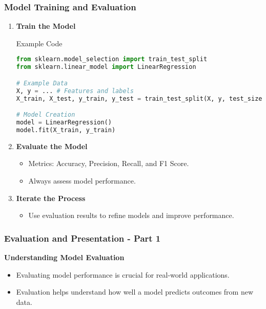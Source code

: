 \documentclass[aspectratio=169]{beamer}
\begin{document}
\begin{frame}[fragile]
    \frametitle{Model Training and Evaluation}
    \begin{enumerate}[resume]
        \item \textbf{Train the Model}
        \begin{block}{Example Code}
            \begin{lstlisting}[language=Python]
from sklearn.model_selection import train_test_split
from sklearn.linear_model import LinearRegression

# Example Data
X, y = ... # Features and labels
X_train, X_test, y_train, y_test = train_test_split(X, y, test_size=0.2, random_state=42)

# Model Creation
model = LinearRegression()
model.fit(X_train, y_train)
            \end{lstlisting}
        \end{block}
        
        \item \textbf{Evaluate the Model}
        \begin{itemize}
            \item Metrics: Accuracy, Precision, Recall, and F1 Score.
            \item Always assess model performance.
        \end{itemize}

        \item \textbf{Iterate the Process}
        \begin{itemize}
            \item Use evaluation results to refine models and improve performance.
        \end{itemize}
    \end{enumerate}
\end{frame}

\begin{frame}[fragile]
    \frametitle{Evaluation and Presentation - Part 1}
    \textbf{Understanding Model Evaluation}
    \begin{itemize}
        \item Evaluating model performance is crucial for real-world applications.
        \item Evaluation helps understand how well a model predicts outcomes from new data.
    \end{itemize}
\end{frame}
\end{document}

